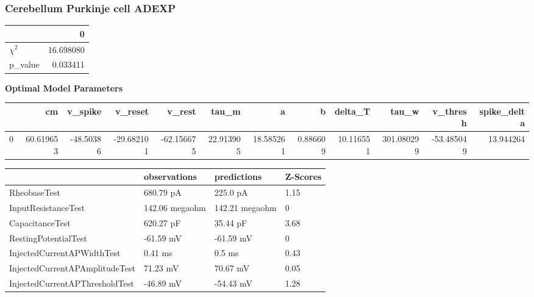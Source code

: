 \subsubsection{Cerebellum Purkinje cell ADEXP}\begin{tabular}{lr}
\toprule
{} &          0 \\
\midrule
$\chi^{2}$ &  16.698080 \\
p\_value    &   0.033411 \\
\bottomrule
\end{tabular}
\textbf{Optimal Model Parameters} \begin{tabular}{lrrrrrrrrrrr}
\toprule
{} &         cm &   v\_spike &    v\_reset &     v\_rest &      tau\_m &          a &         b &    delta\_T &       tau\_w &   v\_thresh &  spike\_delta \\
\midrule
0 &  60.619653 & -48.50386 & -29.682101 & -62.156675 &  22.913905 &  18.585261 &  0.886609 &  10.116551 &  301.080299 & -53.485049 &    13.944264 \\
\bottomrule
\end{tabular}
\begin{tabular}{llll}
\toprule
{} &    observations &     predictions & Z-Scores \\
\midrule
RheobaseTest                   &       680.79 pA &        225.0 pA &     1.15 \\
InputResistanceTest            &  142.06 megaohm &  142.21 megaohm &        0 \\
CapacitanceTest                &       620.27 pF &        35.44 pF &     3.68 \\
RestingPotentialTest           &       -61.59 mV &       -61.59 mV &        0 \\
InjectedCurrentAPWidthTest     &         0.41 ms &          0.5 ms &     0.43 \\
InjectedCurrentAPAmplitudeTest &        71.23 mV &        70.67 mV &     0.05 \\
InjectedCurrentAPThresholdTest &       -46.89 mV &       -54.43 mV &     1.28 \\
\bottomrule
\end{tabular}
